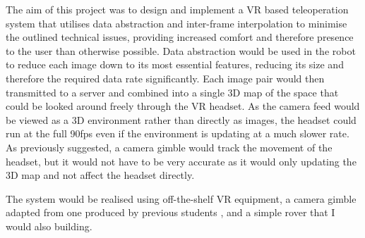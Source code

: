 The aim of this project was to design and implement a VR based teleoperation system that utilises data abstraction and inter-frame interpolation to minimise the outlined technical issues, providing increased comfort and therefore presence to the user than otherwise possible. Data abstraction would be used in the robot to reduce each image down to its most essential features, reducing its size and therefore the required data rate significantly. Each image pair would then transmitted to a server and combined into a single 3D map of the space that could be looked around freely through the VR headset. As the camera feed would be viewed as a 3D environment rather than directly as images, the headset could run at the full 90fps even if the environment is updating at a much slower rate. As previously suggested, a camera gimble would track the movement of the headset, but it would not have to be very accurate as it would only updating the 3D map and not affect the headset directly.

The system would be realised using off-the-shelf VR equipment, a camera gimble adapted from one produced by previous students \cite{gimble}, and a simple rover that I would also building.
